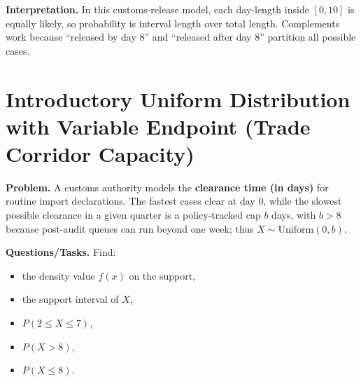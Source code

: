 \textbf{Interpretation.}
In this customs-release model, each day-length inside $[0,10]$ is equally likely, so probability is interval length over total length. Complements work because ``released by day 8'' and ``released after day 8'' partition all possible cases.

\section{Introductory Uniform Distribution with Variable Endpoint (Trade Corridor Capacity)}

\textbf{Problem.}
A customs authority models the \textbf{clearance time (in days)} for routine import declarations. The fastest cases clear at day 0, while the slowest possible clearance in a given quarter is a policy-tracked cap $b$ days, with $b>8$ because post-audit queues can run beyond one week; thus $X\sim \text{Uniform}(0,b)$.

\textbf{Questions/Tasks.}
Find:
\begin{itemize}
	\item[(a)] the density value $f(x)$ on the support,
	\item[(b)] the support interval of $X$,
	\item[(c)] $P(2\le X\le 7)$,
	\item[(d)] $P(X>8)$,
	\item[(e)] $P(X\le 8)$.
\end{itemize}

